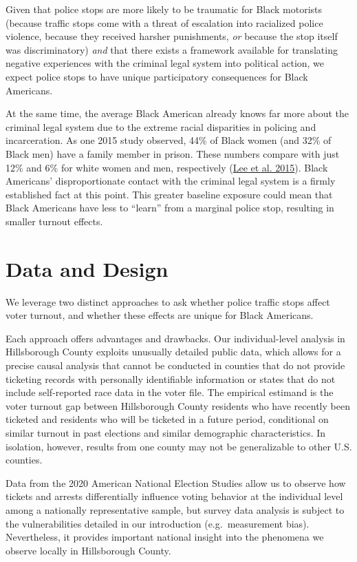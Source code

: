\documentclass[
  12pt,
]{article}
\begin{document}
Given that police stops are more likely to be traumatic for Black motorists (because traffic stops come with a threat of escalation into racialized police violence, because they received harsher punishments, \emph{or} because the stop itself was discriminatory) \emph{and} that there exists a framework available for translating negative experiences with the criminal legal system into political action, we expect police stops to have unique participatory consequences for Black Americans.

At the same time, the average Black American already knows far more about the criminal legal system due to the extreme racial disparities in policing and incarceration. As one 2015 study observed, 44\% of Black women (and 32\% of Black men) have a family member in prison. These numbers compare with just 12\% and 6\% for white women and men, respectively (\protect\hyperlink{ref-Lee2015}{Lee et al. 2015}). Black Americans' disproportionate contact with the criminal legal system is a firmly established fact at this point. This greater baseline exposure could mean that Black Americans have less to ``learn'' from a marginal police stop, resulting in smaller turnout effects.

\hypertarget{data-and-design}{%
\section*{Data and Design}\label{data-and-design}}

We leverage two distinct approaches to ask whether police traffic stops affect voter turnout, and whether these effects are unique for Black Americans.

Each approach offers advantages and drawbacks. Our individual-level analysis in Hillsborough County exploits unusually detailed public data, which allows for a precise causal analysis that cannot be conducted in counties that do not provide ticketing records with personally identifiable information or states that do not include self-reported race data in the voter file. The empirical estimand is the voter turnout gap between Hillsborough County residents who have recently been ticketed and residents who will be ticketed in a future period, conditional on similar turnout in past elections and similar demographic characteristics. In isolation, however, results from one county may not be generalizable to other U.S. counties.

Data from the 2020 American National Election Studies allow us to observe how tickets and arrests differentially influence voting behavior at the individual level among a nationally representative sample, but survey data analysis is subject to the vulnerabilities detailed in our introduction (e.g.~measurement bias). Nevertheless, it provides important national insight into the phenomena we observe locally in Hillsborough County.
\end{document}
